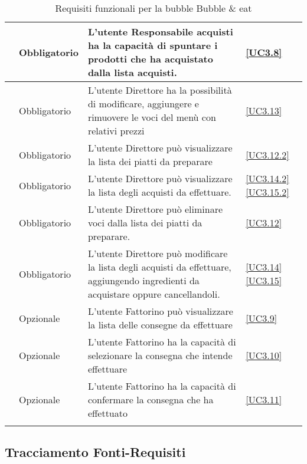 \begin{longtable}{|P{1.5cm}|P{2.5cm}|P{6.5cm}|P{2.5cm}|}
	\hline \RequisitoObF\label{L28} & Obbligatorio & L'utente Responsabile acquisti ha la capacità di spuntare i prodotti che ha acquistato dalla lista acquisti.
	 & \ref{UC3.8} \\
	\hline \RequisitoObF\label{L29} & Obbligatorio & L'utente Direttore ha la possibilità di modificare, aggiungere e rimuovere le voci del menù con relativi prezzi & \ref{UC3.13} \\
	\hline \RequisitoObF\label{L30} & Obbligatorio & L'utente Direttore può visualizzare la lista dei piatti da preparare & \ref{UC3.12.2} \\
	\hline \RequisitoObF\label{L31} & Obbligatorio & L'utente Direttore può visualizzare la lista degli acquisti da effettuare. & \ref{UC3.14.2} \ref{UC3.15.2} \\
	\hline \RequisitoObF\label{L32} & Obbligatorio & L'utente Direttore può eliminare voci dalla lista dei piatti da preparare. & \ref{UC3.12} \\
	\hline \RequisitoObF\label{L53} & Obbligatorio & L'utente Direttore può modificare la lista degli acquisti da effettuare, aggiungendo ingredienti da acquistare oppure cancellandoli.
	 & \ref{UC3.14} \linebreak \ref{UC3.15} \\	 
	\hline \RequisitoOpF\label{L50} & Opzionale & L'utente Fattorino può visualizzare la lista delle consegne da effettuare & \ref{UC3.9} \\
	\hline \RequisitoOpF\label{L51} & Opzionale & L'utente Fattorino ha la capacità di selezionare la consegna che intende effettuare & \ref{UC3.10} \\
	\hline \RequisitoOpF\label{L52} & Opzionale & L'utente Fattorino ha la capacità di confermare la consegna che ha effettuato & \ref{UC3.11} \\
	\hline
	\caption{Requisiti funzionali per la bubble Bubble \& eat}
\end{longtable}

\subsection{Tracciamento Fonti-Requisiti}

